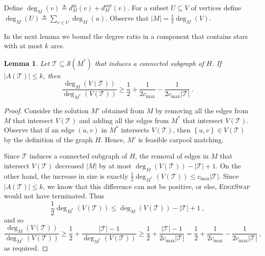 \documentclass[11pt]{article}
\newtheorem{lemma}{Lemma}
\newcommand{\set}[1]{\left\{ #1 \right\}}
\newcommand{\abs}[1]{\left| #1 \right|}
\newcommand{\eqdf}{\triangleq}
\newcommand{\half}{\frac{1}{2}}
\newcommand{\inv}[1]{\frac{1}{#1}}
\newcommand{\din}[1][M]{d^{\text{in}}_{#1}}
\newcommand{\dout}[1][M]{d^{\text{out}}_{#1}}
\newcommand{\cmax}{c_{\max}}
\newcommand{\calS}{\mathcal{S}}
\newcommand{\calT}{\mathcal{T}}
\begin{document}
\iffalse %

\begin{proof}
Let $T$ be any spanning tree of $G$ and let $r$ be an arbitrary root.
Starting with $r$, repeatedly choose a child whose subtree is strictly
larger than $\frac{\Delta-1}{\Delta} \abs{V}$, until this is not
possible.  Hence, we have reached a vertex $v$ whose subtree contains
more than $\frac{\Delta-1}{\Delta} \abs{V}$ vertices, but the subtrees
of its children contain at most $\frac{\Delta-1}{\Delta} \abs{V}$
vertices.
%
If $v = r$, then $v$ has a child $u$ with at least $\inv{\Delta}
(\abs{V}-1) \geq \ell$ vertices.  Otherwise, there exists a child $u$
of $v$ whose subtree is of size at least
$\inv{\Delta} \abs{V} \geq \ell$.  Disconnect $u$ and the vertices in
its subtree from the graph.
%
In both cases $u$'s subtree contains at most
$\frac{\Delta-1}{\Delta} \abs{V}$ vertices, and thus at least
$\inv{\Delta} \abs{V} \geq \ell$ vertices remain in the graph.  Hence
we obtain two connected subgraphs of size at least $\ell$.
%
We repeat this procedure recursively on any component of size
strictly larger $\Delta\ell$.
\end{proof}

\fi %

Define $\deg_M(v) \eqdf \din[M](v) + \dout[M](v)$.  For a subset
$U \subseteq V$ of vertices define $\deg_M(U) \eqdf \sum_{v \in
U} \deg_M(u)$.
%
Observe that $\abs{M} = \half \deg_M(V)$.

In the next lemma we bound the degree ratio in a component that
contains stars with at most $k$ arcs.

\begin{lemma}
\label{lemma:r}
Let $\calT \subseteq \calS(M^*)$ that induces a connected subgraph of
$H$.  If $\abs{A(\calT)} \leq k$, then
\[
\frac{\deg_M(V(\calT))}{\deg_{M^*}(V(\calT))} 
\geq \half + \inv{2\cmax} - \inv{2\cmax\abs{\calT}}
~.
\]
\end{lemma}
\begin{proof}
Consider the solution $M'$ obtained from $M$ by removing all the
edges from $M$ that intersect $V(\calT)$ and adding all the edges from
$M^*$ that intersect $V(\calT)$.  Observe that if an edge $(u,v)$ in
$M^*$ intersects $V(\calT)$, then $\set{u,v} \in V(\calT)$ by the
definition of the graph $H$.  Hence, $M'$ is feasible carpool
matching.

Since $\calT$ induces a connected subgraph of $H$, the removal of
edges in $M$ that intersect $V(\calT)$ decreased $\abs{M}$ by at most
$\deg_M(V(\calT)) - \abs{\calT} + 1$.
%
On the other hand, the increase in size is exactly
 $\half \deg_{M^*}(V(\calT)) \leq \cmax \abs{\calT}$.
%
Since $\abs{A(\calT)} \leq k$, we know that this difference can not be
positive, or else, \textsc{EdgeSwap} would not have terminated.  Thus
\[
\half \deg_{M^*}(V(\calT)) \leq \deg_M(V(\calT)) - \abs{\calT} + 1
~,
\]
and so
\[
\frac{\deg_M(V(\calT))}{\deg_{M^*}(V(\calT))}
\geq \half + \frac{\abs{\calT} - 1}{\deg_{M^*}(V(\calT))}
\geq \half + \frac{\abs{\calT} - 1}{2\cmax \abs{\calT}}
=    \half + \inv{2\cmax} - \inv{2\cmax \abs{\calT}}
~,
\]
as required.
\end{proof}
\end{document}

